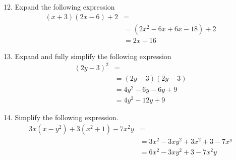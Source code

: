 12. Expand the following expression
\begin{align*}
    (x+3)(2x-6)+2 &=\\
    &= (2x^2-6x + 6x -18) + 2\\
    &= 2x-16
\end{align*}

13. Expand and fully simplify the following expression
\begin{align*}
    (2y-3)^2 &=\\
    &= (2y-3)(2y-3)\\
    &= 4y^2 - 6y - 6y +9\\
    &= 4y^2 -12y + 9
\end{align*}

14. Simplify the following expression.
\begin{align*}
    3x(x-y^2)+3(x^2+1)-7x^2y &=\\
    &= 3x^2 - 3xy^2 + 3x^2 + 3 - 7x^y\\
    &= 6x^2 - 3xy^2 + 3 - 7x^2y
\end{align*}